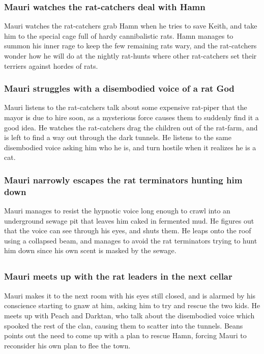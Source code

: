 \subsubsection{\Gls{Mauri} watches the rat-catchers deal with \Gls{Hamn}}
\Gls{Mauri} watches the rat-catchers grab \Gls{Hamn} when he tries to save \Gls{Keith}, and take him
to the special cage full of hardy cannibalistic rats. \Gls{Hamn} manages to summon his inner rage to
keep the few remaining rats wary, and the rat-catchers wonder how he will do at the nightly
rat-hunts where other rat-catchers set their terriers against hordes of rats.

\subsubsection{\Gls{Mauri} struggles with a disembodied voice of a rat God}
\Gls{Mauri} listens to the rat-catchers talk about some expensive rat-piper that the mayor is due
to hire soon, as a mysterious force causes them to suddenly find it a good idea. He watches the
rat-catchers drag the children out of the rat-farm, and is left to find a way out through the dark
tunnels. He listens to the same disembodied voice asking him who he is, and turn hostile when it
realizes he is a cat.

\subsubsection{\Gls{Mauri} narrowly escapes the rat terminators hunting him down}
\Gls{Mauri} manages to resist the hypnotic voice long enough to crawl into an underground sewage
pit that leaves him caked in fermented mud. He figures out that the voice can see through his eyes,
and shuts them. He leaps onto the roof using a collapsed beam, and manages to avoid the rat
terminators trying to hunt him down since his own scent is masked by the sewage.

\subsection{}
\subsubsection{\Gls{Mauri} meets up with the rat leaders in the next cellar}
\Gls{Mauri} makes it to the next room with his eyes still closed, and is alarmed by his conscience
starting to gnaw at him, asking him to try and rescue the two kids. He meets up with \Gls{Peach}
and \Gls{Darktan}, who talk about the disembodied voice which spooked the rest of the clan, causing
them to scatter into the tunnels. \Gls{Beans} points out the need to come up with a plan to rescue
\Gls{Hamn}, forcing \Gls{Mauri} to reconsider his own plan to flee the town.

